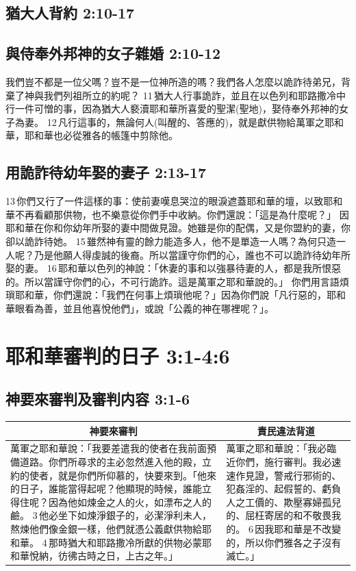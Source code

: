 \subsection{猶大人背約 2:10-17}
\subsection{與侍奉外邦神的女子雜婚 2:10-12}
我們豈不都是一位父嗎？豈不是一位神所造的嗎？我們各人怎麼以詭詐待弟兄，背棄了神與我們列祖所立的約呢？ 11 猶大人行事詭詐，並且在以色列和耶路撒冷中行一件可憎的事，因為猶大人褻瀆耶和華所喜愛的聖潔(聖地)，娶侍奉外邦神的女子為妻。 12 凡行這事的，無論何人(叫醒的、答應的)，就是獻供物給萬軍之耶和華，耶和華也必從雅各的帳篷中剪除他。 

\subsection{用詭詐待幼年娶的妻子 2:13-17}
13 你們又行了一件這樣的事：使前妻嘆息哭泣的眼淚遮蓋耶和華的壇，以致耶和華不再看顧那供物，也不樂意從你們手中收納。你們還說：「這是為什麼呢？」
因耶和華在你和你幼年所娶的妻中間做見證。她雖是你的配偶，又是你盟約的妻，你卻以詭詐待她。 15 雖然神有靈的餘力能造多人，他不是單造一人嗎？為何只造一人呢？乃是他願人得虔誠的後裔。所以當謹守你們的心，誰也不可以詭詐待幼年所娶的妻。 16 耶和華以色列的神說：「休妻的事和以強暴待妻的人，都是我所恨惡的。所以當謹守你們的心，不可行詭詐。這是萬軍之耶和華說的。」
你們用言語煩瑣耶和華，你們還說：「我們在何事上煩瑣他呢？」因為你們說「凡行惡的，耶和華眼看為善，並且他喜悅他們」，或說「公義的神在哪裡呢？」。


\section{耶和華審判的日子 3:1-4:6}
\subsection{神要來審判及審判内容 3:1-6}
\begin{table}[H]
\centering
\begin{tabular}{p{10.75cm}|p{6.50cm}}\hline\hline
\multicolumn{1}{c|}{神要來審判}&\multicolumn{1}{c}{責民違法背道}\\\hline
萬軍之耶和華說：「我要差遣我的使者在我前面預備道路。你們所尋求的主必忽然進入他的殿，立約的使者，就是你們所仰慕的，快要來到。「他來的日子，誰能當得起呢？他顯現的時候，誰能立得住呢？因為他如煉金之人的火，如漂布之人的鹼。 3 他必坐下如煉淨銀子的，必潔淨利未人，熬煉他們像金銀一樣，他們就憑公義獻供物給耶和華。 4 那時猶大和耶路撒冷所獻的供物必蒙耶和華悅納，彷彿古時之日，上古之年。」
&萬軍之耶和華說：「我必臨近你們，施行審判。我必速速作見證，警戒行邪術的、犯姦淫的、起假誓的、虧負人之工價的、欺壓寡婦孤兒的、屈枉寄居的和不敬畏我的。 6 因我耶和華是不改變的，所以你們雅各之子沒有滅亡。」\\\hline
\end{tabular}
\end{table}


